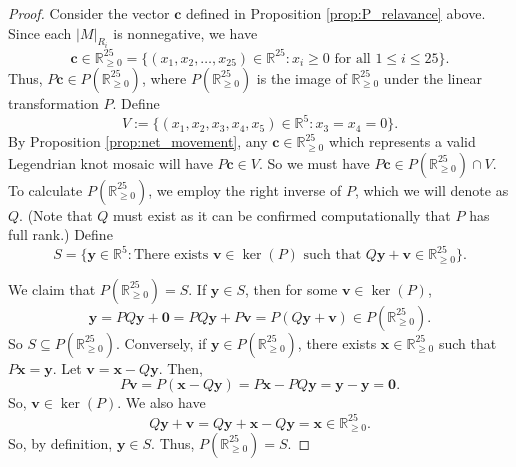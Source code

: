 \documentclass{article}
\newcommand{\R}{\mathbb{R}}
\begin{document}
\begin{proof}
    Consider the vector $\textbf{c}$ defined in Proposition  \ref{prop:P_relavance} above.
    Since each $|M|_{R_i}$ is nonnegative, we have
    $$\textbf{c}\in\R^{25}_{\geq0}=\{(x_1,x_2,\dots,x_{25})\in\R^{25}:x_i\geq0\text{ for all }1\leq i\leq 25\}.$$
    Thus, $P\textbf{c}\in P(\R^{25}_{\geq0})$, where $P(\R^{25}_{\geq0})$ is the image of $\R^{25}_{\geq0}$ under the linear transformation $P$.
    Define 
    $$V:=\{(x_1,x_2,x_3,x_4,x_5)\in\R^5:x_3=x_4=0\}.$$ 
    By Proposition \ref{prop:net_movement}, any $\textbf{c}\in\R^{25}_{\geq0}$ which represents a valid Legendrian knot mosaic will have $P\textbf{c}\in V$. So we must have $P\textbf{c}\in P(\R^{25}_{\geq0})\cap V$. To calculate $P(\R^{25}_{\geq0})$, we employ the right inverse of $P$, which we will denote as $Q$. (Note that  $Q$ must exist as it can be confirmed  computationally that $P$ has full rank.) Define
    $$S=\{\textbf{y}\in\R^5:\text{There exists } \textbf{v}\in\ker(P)\text{ such that }Q\textbf{y}+\textbf{v}\in\R^{25}_{\geq0}\}.$$


    We claim that $P(\R^{25}_{\geq0})=S$. If $\textbf{y}\in S$, then for some $\textbf{v}\in\ker(P)$,
    $$\textbf{y}=PQ\textbf{y}+\textbf{0}=PQ\textbf{y}+P\textbf{v}=P(Q\textbf{y}+\textbf{v})\in P(\R^{25}_{\geq0}).$$
    So $S\subseteq P(\R^{25}_{\geq0})$. Conversely,  if $\textbf{y}\in P(\R^{25}_{\geq0})$, there  exists $\textbf{x}\in\R^{25}_{\geq0}$ such that $P\textbf{x}=\textbf{y}$. Let $\textbf{v}=\textbf{x}-Q\textbf{y}$. Then,
    $$P\textbf{v}=P(\textbf{x}-Q\textbf{y})=P\textbf{x}-PQ\textbf{y}=\textbf{y}-\textbf{y}=\textbf{0}.$$
    So, $\textbf{v}\in\ker(P)$.
    We also have
    $$Q\textbf{y}+\textbf{v}=Q\textbf{y}+\textbf{x}-Q\textbf{y}=\textbf{x}\in\R^{25}_{\geq0}.$$
    So, by definition, $\textbf{y}\in S$. Thus, $P(\R^{25}_{\geq0})=S$.


\end{proof}
\end{document}
